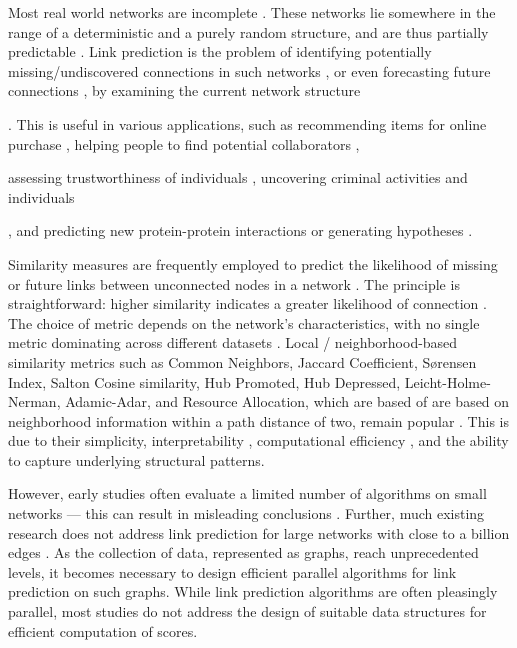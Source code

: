 Most real world networks are incomplete \cite{kim2011network, wang2014link}. These networks lie somewhere in the range of a deterministic and a purely random structure, and are thus partially predictable \cite{lu2015toward}. Link prediction is the problem of identifying potentially missing/undiscovered connections in such networks \cite{marchette2008predicting, kim2011network}, or even forecasting future connections \cite{bringmann2010learning, juszczyszyn2011link}, by examining the current network structure. This is useful in various applications, such as recommending items for online purchase \cite{akcora2011network}, helping people to find potential collaborators \cite{mori2012machine, tang2012cross}, assessing trustworthiness of individuals \cite{alnumay2019trust}, uncovering criminal activities and individuals \cite{berlusconi2016link, lim2019hidden}, and predicting new protein-protein interactions or generating hypotheses \cite{cannistraci2013link, nasiri2021novel}.

Similarity measures are frequently employed to predict the likelihood of missing or future links between unconnected nodes in a network \cite{wang2014link, arrar2023comprehensive}. The principle is straightforward: higher similarity indicates a greater likelihood of connection \cite{wang2014link}. The choice of metric depends on the network's characteristics, with no single metric dominating across different datasets \cite{arrar2023comprehensive, zhou2021progresses}. Local / neighborhood-based similarity metrics such as Common Neighbors, Jaccard Coefficient,  S{\o}rensen Index, Salton Cosine similarity, Hub Promoted, Hub Depressed, Leicht-Holme-Nerman, Adamic-Adar, and Resource Allocation, which are based of are based on neighborhood information within a path distance of two, remain popular \cite{arrar2023comprehensive, wang2014link}. This is due to their simplicity, interpretability \cite{pai2019netdx, barbieri2014follow}, computational efficiency \cite{garcia2014link}, and the ability to capture underlying structural patterns.

However, early studies often evaluate a limited number of algorithms on small networks --- this can result in misleading conclusions \cite{zhou2021progresses, zhou2021experimental}. Further, much existing research does not address link prediction for large networks with close to a billion edges \cite{muscoloni2022adaptive, mumin2022efficient, nasiri2021novel, xian2021towards, ghasemian2020stacking, mara2020benchmarking, wang2019link, xu2019distributed, mohan2017scalable, cui2016bounded, garcia2014link, papadimitriou2012fast}. As the collection of data, represented as graphs, reach unprecedented levels, it becomes necessary to design efficient parallel algorithms for link prediction on such graphs. While link prediction algorithms are often pleasingly parallel, most studies do not address the design of suitable data structures for efficient computation of scores.

